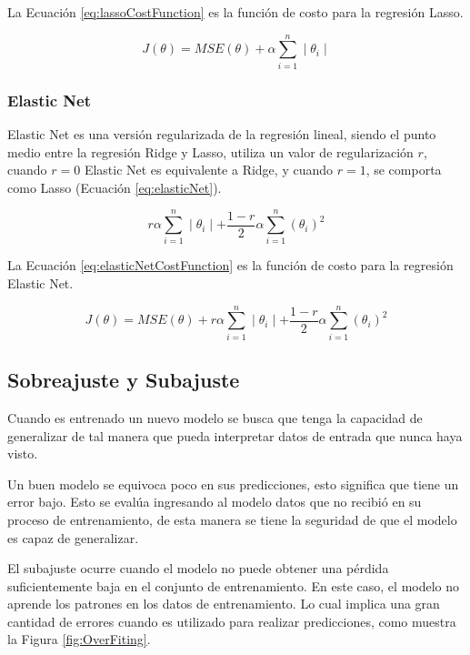 La Ecuación \ref{eq:lassoCostFunction} es la función de costo para la regresión Lasso.

\begin{equation}
    \label{eq:lassoCostFunction}
    J(\theta) = MSE(\theta)
    + \alpha \displaystyle\sum\limits_{i=1}^n  \mid \theta_i \mid
\end{equation}

\subsubsection{Elastic Net}

Elastic Net es una versión regularizada de la regresión lineal, siendo el punto medio entre la regresión Ridge y Lasso, utiliza un valor de regularización $r$, cuando $r = 0$ Elastic Net es equivalente a Ridge, y cuando $r = 1$, se comporta como Lasso (Ecuación \ref{eq:elasticNet}).

\begin{equation}
    \label{eq:elasticNet}
    r \alpha \displaystyle\sum\limits_{i=1}^n  \mid \theta_i \mid
    + \frac{1 - r}{2} \alpha \displaystyle\sum\limits_{i=1}^n  (\theta_i)^{2}
\end{equation}

La Ecuación \ref{eq:elasticNetCostFunction} es la función de costo para la regresión Elastic Net.

\begin{equation}
    \label{eq:elasticNetCostFunction}
    J(\theta) = MSE(\theta)
    + r \alpha \displaystyle\sum\limits_{i=1}^n  \mid \theta_i \mid
    + \frac{1 - r}{2} \alpha \displaystyle\sum\limits_{i=1}^n  (\theta_i)^{2}
\end{equation}

\subsection{Sobreajuste y Subajuste}

Cuando es entrenado un nuevo modelo se busca que tenga la capacidad de generalizar de tal manera que pueda interpretar datos de entrada que nunca haya visto.

Un buen modelo se equivoca poco en sus predicciones, esto significa que tiene un error bajo. Esto se evalúa ingresando al modelo datos que no recibió en su proceso de entrenamiento, de esta manera se tiene la seguridad de que el modelo es capaz de generalizar.

El subajuste ocurre cuando el modelo no puede obtener una pérdida suficientemente baja en el conjunto de entrenamiento. En este caso, el modelo no aprende los patrones en los datos de entrenamiento. Lo cual implica una gran cantidad de errores cuando es utilizado para realizar predicciones, como muestra la Figura \ref{fig:OverFiting}.


